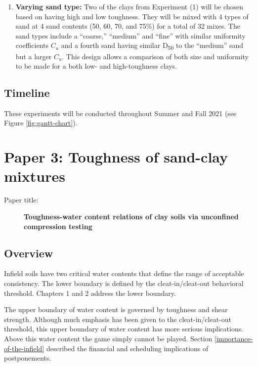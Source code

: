 \documentclass[
  letterpaper,
  openany]{book}
\providecommand{\tightlist}{%
  \setlength{\itemsep}{0pt}\setlength{\parskip}{0pt}}
\begin{document}
\begin{enumerate}
\def\labelenumi{\arabic{enumi}.}
\setcounter{enumi}{2}
\tightlist
\item
  \textbf{Varying sand type:} Two of the clays from Experiment (1) will be chosen based on having high and low toughness.
  They will be mixed with 4 types of sand at 4 sand contents (50, 60, 70, and 75\%) for a total of 32 mixes.
  The sand types include a ``coarse,'' ``medium'' and ``fine'' with similar uniformity coefficients \(C_u\) and a fourth sand having similar D\textsubscript{50} to the ``medium'' sand but a larger \(C_u\).
  This design allows a comparison of both size and uniformity to be made for a both low- and high-toughness clays.
\end{enumerate}

\hypertarget{timeline-1}{%
\subsection{Timeline}\label{timeline-1}}

These experiments will be conducted throughout Summer and Fall 2021 (see Figure \ref{fig:gantt-chart}).

\newpage

\hypertarget{paper-3-toughness-of-sand-clay-mixtures}{%
\section{Paper 3: Toughness of sand-clay mixtures}\label{paper-3-toughness-of-sand-clay-mixtures}}

\begin{description}
\item[Paper title:]
\textbf{Toughness-water content relations of clay soils via unconfined compression testing}
\end{description}

\hypertarget{overview-2}{%
\subsection{Overview}\label{overview-2}}

Infield soils have two critical water contents that define the range of acceptable consistency. The lower boundary is defined by the cleat-in/cleat-out behavioral threshold. Chapters 1 and 2 address the lower boundary.

The upper boundary of water content is governed by toughness and shear strength.
Although much emphasis has been given to the cleat-in/cleat-out threshold, this upper boundary of water content has more serious implications. Above this water content the game simply cannot be played.
Section \ref{importance-of-the-infield} described the financial and scheduling implications of postponements.
\end{document}
